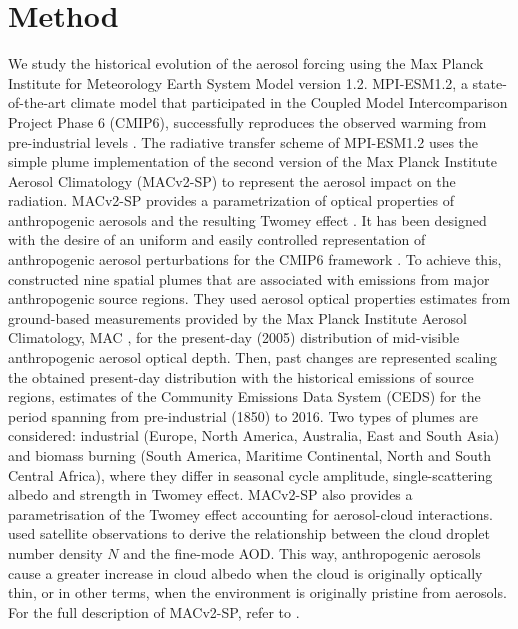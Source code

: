 \documentclass[draft]{agujournal2019}
\begin{document}
\section{Method}\label{sec:method}
      We study the historical evolution of the aerosol forcing using the Max Planck Institute for Meteorology Earth System Model version 1.2. MPI-ESM1.2, a state-of-the-art climate model \cite{Mauritsen_2019} that participated in the Coupled Model Intercomparison Project Phase 6 (CMIP6), successfully reproduces the observed warming from pre-industrial levels \cite{Mauritsen_2020}.
      The radiative transfer scheme of MPI-ESM1.2 uses the simple plume implementation of the second version of the Max Planck Institute Aerosol Climatology (MACv2-SP) to represent the aerosol impact on the radiation. MACv2-SP provides a parametrization of optical properties of anthropogenic aerosols and the resulting Twomey effect \cite{Stevens_2017}. It has been designed with the desire of an uniform and easily controlled representation of anthropogenic aerosol perturbations for the CMIP6 framework \cite{Pincus_2016}. To achieve this,  constructed nine spatial plumes that are associated with emissions from major anthropogenic source regions. They used aerosol optical properties estimates from ground-based measurements provided by the Max Planck Institute Aerosol Climatology, MAC \cite{Kinne_2013}, for the present-day (2005) distribution of mid-visible anthropogenic aerosol optical depth. Then, past changes are represented scaling the obtained present-day distribution with the historical emissions of source regions, estimates of the Community Emissions Data System (CEDS) for the period spanning from pre-industrial (1850) to 2016. Two types of plumes are considered: industrial (Europe, North America, Australia, East and South Asia) and biomass burning (South America, Maritime Continental, North and South Central Africa), where they differ in seasonal cycle amplitude, single-scattering albedo and strength in Twomey effect. 
      MACv2-SP also provides a parametrisation of the Twomey effect accounting for aerosol-cloud interactions.  used satellite observations to derive the relationship between the cloud droplet number density $N$ and the fine-mode AOD. This way, anthropogenic aerosols cause a greater increase in cloud albedo when the cloud is originally optically thin, or in other terms, when the environment is originally pristine from aerosols.
      For the full description of MACv2-SP, refer to .
\end{document}

